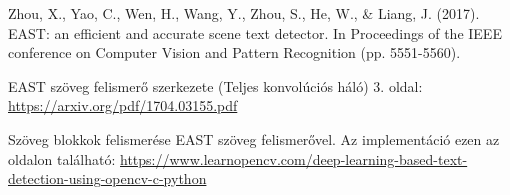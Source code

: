 \documentclass[a4paper,12pt]{article}
\begin{document}
\begin{thebibliography}{9}
Zhou, X., Yao, C., Wen, H., Wang, Y., Zhou, S., He, W., & Liang, J. (2017). EAST: an efficient and accurate scene text detector. In Proceedings of the IEEE conference on Computer Vision and Pattern Recognition (pp. 5551-5560).

EAST szöveg felismerő szerkezete (Teljes konvolúciós háló) 3. oldal: \url{https://arxiv.org/pdf/1704.03155.pdf}



Szöveg blokkok felismerése EAST szöveg felismerővel. Az implementáció ezen az oldalon található:  \url{https://www.learnopencv.com/deep-learning-based-text-detection-using-opencv-c-python}

\end{thebibliography}
\end{document}
